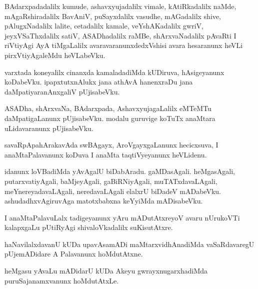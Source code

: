 \documentclass{article}
\begin{document}
\begin{mn}
BAdarxpadadalilx  kumude,  ashavxyujadalilx  vimale,  kAtiRkadalilx  naMde,  mAgaRshiradalilx  
BavAniV,  puSayxdalilx  vasudhe,  mAGadalilx  shive,  pAlugxNadalilx  lalite,  cetadalilx  kamale,  
veYshAKadalilx  gwriV,  jeyxVSaThxdalilx  satiV,  ASADhadalilx  raMBe,  shArxvaNadalilx  pAvaRti  I  
riVtiyAgi  AyA  tiMgaLalilx  avaravaranunxdedxVshisi  avara  hesaranunx  heVLi  pirxVtiyAgaleMdu  heVLabeVku.
\end{mn}

\begin{mn}
varxtada  koneyalilx  cinanxda  kamaladadiMda  kUDiruva,  hAsigeyanunx  koDabeVku.  ipapxtutxnAlukx  
jana  athAvA  hanenxraDu  jana  daMpatiyaranAnxgaliV  pUjisabeVku.
\end{mn}

\begin{mn}
ASADha,  shArxvaNa,  BAdarxpada,  AshavxyujagaLalilx  eMTeMTu  daMpatigaLanunx  pUjisabeVku.  
modalu  guruvige  koTuTx  anaMtara  uLidavaranunx  pUjisabeVku.
\end{mn}

\begin{mn}
savaRpApahArakavAda  swBAgayx,  AroVgayxgaLanunx  hecicxsuva,  I  anaMtaPalavanunx  koDuva  I  
anaMta  taqtiVyeyanunx  heVLidenu.
\end{mn}

\begin{mn}
idanunx  loVBadiMda  yAvAgalU  biDabAradu.  gaMDasAgali.  heMgasAgali,  putarxvatiyAgali,  
baMjeyAgali,  gaBiRNiyAgali,  muTATxdavaLAgali,  meYnereyadavaLAgali,  neredavaLAgali  
elalxrU  biDadeV  mADabeVku.  ashudadhxvAgiruvAga  matotxbabxna  keYyiMda  mADisabeVku.
\end{mn}

\begin{mn}
I  anaMtaPalavuLalx  tadigeyanunx  yAru  mADutAtxreyoV  avaru  nUrukoVTi  kalapxgaLu  
pUtiRyAgi  shivaloVkadalilx  suKisutAtxre.
\end{mn}

\begin{mn}
haNavilalxdavanU  kUDa  upavAsamADi  maMtarxvidhAnadiMda  vaSaRdavaregU  pUjemADidare  
A  Palavanunx  hoMdutAtxne.
\end{mn}

\begin{mn}
heMgasu  yAvaLu  mADidarU  kUDa  Akeyu  gwrayxnugarxhadiMda  puruSajanamxvanunx  hoMdutAtxLe.
\end{mn}
\end{document}
